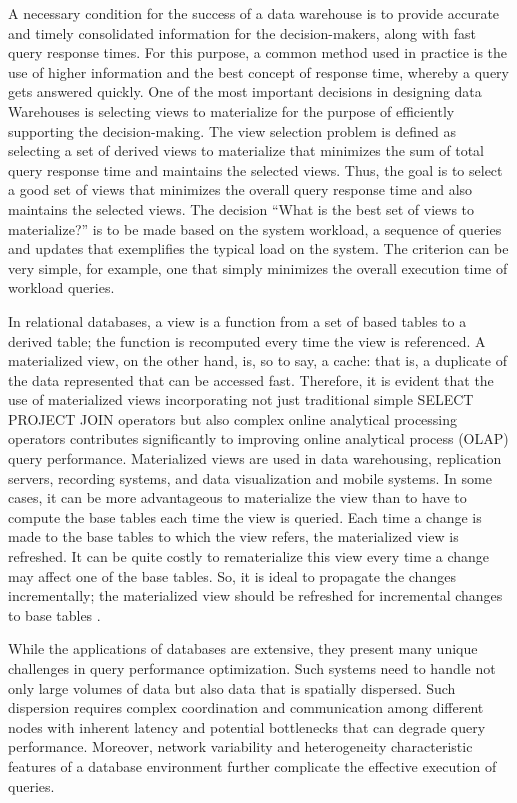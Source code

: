 A necessary condition for the success of a data warehouse is to provide accurate and timely consolidated information for the decision-makers, along with fast query response times. For this purpose, a common method used in practice is the use of higher information and the best concept of response time, whereby a query gets answered quickly. One of the most important decisions in designing data Warehouses is selecting views to materialize for the purpose of efficiently supporting the decision-making. The view selection problem is defined as selecting a set of derived views to materialize that minimizes the sum of total query response time and maintains the selected views. Thus, the goal is to select a good set of views that minimizes the overall query response time and also maintains the selected views. The decision ``What is the best set of views to materialize?'' is to be made based on the system workload, a sequence of queries and updates that exemplifies the typical load on the system. The criterion can be very simple, for example, one that simply minimizes the overall execution time of workload queries.\vspace{.4cm}

In relational databases, a view is a function from a set of based tables to a derived table; the function is recomputed every time the view is referenced. A materialized view, on the other hand, is, so to say, a cache: that is, a duplicate of the data represented that can be accessed fast. Therefore, it is evident that the use of materialized views incorporating not just traditional simple SELECT PROJECT JOIN operators but also complex online analytical processing operators contributes significantly to improving online analytical process (OLAP) query performance. Materialized views are used in data warehousing, replication servers, recording systems, and data visualization and mobile systems. In some cases, it can be more advantageous to materialize the view than to have to compute the base tables each time the view is queried. Each time a change is made to the base tables to which the view refers, the materialized view is refreshed. It can be quite costly to rematerialize this view every time a change may affect one of the base tables. So, it is ideal to propagate the changes incrementally; the materialized view should be refreshed for incremental changes to base tables \cite{Data_warehousing,efficient_incremental,rashid2009role}.\vspace{.4cm}

While the applications of databases are extensive, they present many unique challenges in query performance optimization. Such systems need to handle not only large volumes of data but also data that is spatially dispersed. Such dispersion requires complex coordination and communication among different nodes with inherent latency and potential bottlenecks that can degrade query performance. Moreover, network variability and heterogeneity characteristic features of a database environment further complicate the effective execution of queries.

